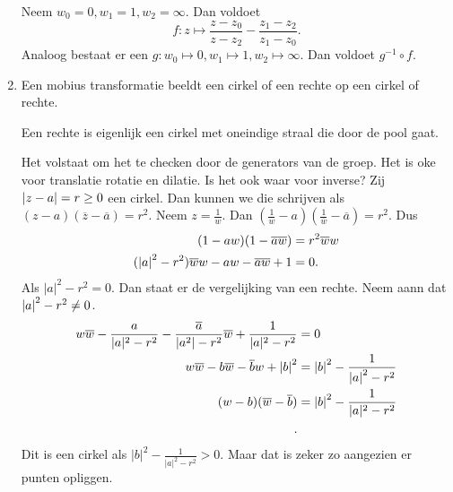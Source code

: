 \begin{opmerking}
\begin{enumerate}
			Neem $w_0 = 0, w_1 = 1, w_2 = \infty$. 
			Dan voldoet \[
			f: z\mapsto \frac{z - z_0}{z - z_2} - \frac{z_1 - z_2}{z_1-z_0}
			.\]  
			Analoog bestaat er een $g: w_0\mapsto 0, w_1\mapsto 1, w_2\mapsto  \infty$. 
			Dan voldoet $g^{-1} \circ f$.
		\item Een mobius transformatie beeldt een cirkel of een rechte op een cirkel of rechte.
			\begin{opmerking}
				Een rechte is eigenlijk een cirkel met oneindige straal die door de pool gaat. 
			\end{opmerking}
			Het volstaat om het te checken door de generators van de groep. 
			Het is oke voor translatie rotatie en dilatie. Is het ook waar voor inverse?
			Zij $\left| z - a \right| = r \ge 0$ een cirkel. Dan kunnen we die schrijven als
			$(z - a) (\overline{z} - \overline{a}) = r^2$. 
			Neem $z = \frac{1}{w}$. 
			Dan $(\frac{1}{w} - a) (\frac{1}{\overline{w}} - \overline{a}) = r^2$. 
			Dus
			\begin{align*}
				(1 - aw) (1- \overline{a}\overline{w}) &= r^2 \overline{w}w \\
				(\left| a \right|^2 - r^2) \overline{w}w - aw - \overline{aw} + 1 &= 0 
			.\end{align*}
			Als $|a|^2 - r^2  = 0$. Dan staat er de vergelijking van een rechte. 
			Neem aann dat $\left| a \right| ^2 - r^2 \ne 0$. 
			\begin{align*}
				w \overline{w} - \frac{a}{|a|^2 - r^2} - \frac{\overline{a}}{ |a^2| - r^2}\overline{w} + \frac{1}{|a|^2 - r^2} &= 0 \\
				w \overline{w} - b \overline{w} - \overline{b} w + \left| b \right| ^2 &= \left| b \right| ^2 - \frac{1}{\left| a \right| ^2 - r^2}\\ 
				(w - b)(\overline{w} - \overline{b})&=  \left| b \right| ^2 - \frac{1}{|a|^2 - r^2}\\
			.\end{align*}	
			Dit is een cirkel als $|b|^2 - \frac{1}{|a|^2 - r^2} > 0$. 
			Maar dat is zeker zo aangezien er punten opliggen.
	\end{enumerate}

\end{opmerking}


